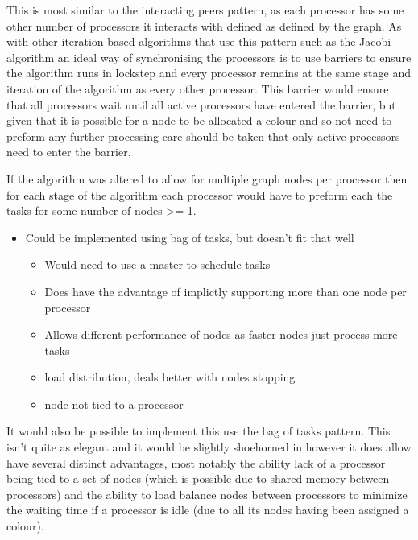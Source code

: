 This is most similar to the interacting peers pattern, as each processor
has some other number of processors it interacts with defined as defined
by the graph. As with other iteration based algorithms that use this
pattern such as the Jacobi algorithm an ideal way of synchronising the
processors is to use barriers to ensure the algorithm runs in lockstep
and every processor remains at the same stage and iteration of the
algorithm as every other processor. This barrier would ensure that all
processors wait until all active processors have entered the barrier,
but given that it is possible for a node to be allocated a colour and so
not need to preform any further processing care should be taken that
only active processors need to enter the barrier.

If the algorithm was altered to allow for multiple graph nodes per
processor then for each stage of the algorithm each processor would have
to preform each the tasks for some number of nodes \textgreater{}= 1.

\begin{itemize}
\itemsep1pt\parskip0pt
\item
  Could be implemented using bag of tasks, but doesn't fit that well

  \begin{itemize}
  \itemsep1pt\parskip0pt
  \item
    Would need to use a master to schedule tasks
  \item
    Does have the advantage of implictly supporting more than one node
    per processor
  \item
    Allows different performance of nodes as faster nodes just process
    more tasks
  \item
    load distribution, deals better with nodes stopping
  \item
    node not tied to a processor
  \end{itemize}
\end{itemize}

It would also be possible to implement this use the bag of tasks
pattern. This isn't quite as elegant and it would be slightly shoehorned
in however it does allow have several distinct advantages, most notably
the ability lack of a processor being tied to a set of nodes (which is
possible due to shared memory between processors) and the ability to
load balance nodes between processors to minimize the waiting time if a
processor is idle (due to all its nodes having been assigned a colour).

